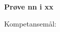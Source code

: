 
\centerline\textbf{Prøve nn  i xx }  \bigskip

Kompetansemål:
\begin{itemize}[noitemsep]

\end{itemize}
